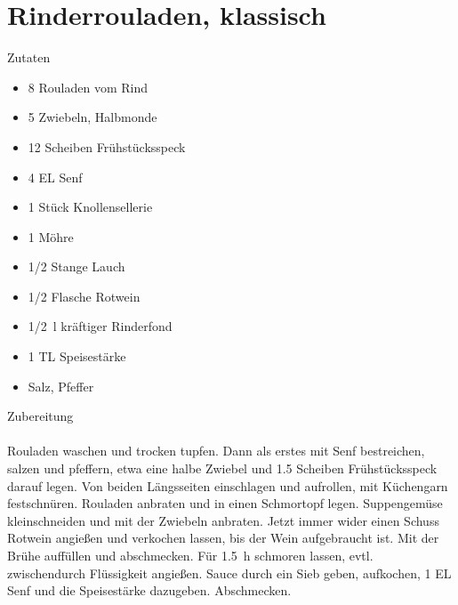 \section*{Rinderrouladen, klassisch}
\ihead{}\ohead{}
\cfoot{}
{\Large Zutaten}
\begin{multicols}{2}
\begin{itemize}
    \item \num{8} Rouladen vom Rind
    \item \num{5} Zwiebeln, Halbmonde
    \item \num{12} Scheiben Frühstücksspeck
    \item \num{4} EL Senf
    \item \num{1} Stück Knollensellerie
    \item \num{1} Möhre
    \item \num{1/2} Stange Lauch
    \item \num{1/2} Flasche Rotwein
    \item \SI{1/2}{l} kräftiger Rinderfond
    \item \num{1} TL Speisestärke
    \item Salz, Pfeffer
\end{itemize}
\end{multicols}
\noindent
{\Large Zubereitung}\\
\\
Rouladen waschen und trocken tupfen.
Dann als erstes mit Senf bestreichen, salzen und pfeffern, etwa eine halbe Zwiebel und \num{1.5} Scheiben Frühstücksspeck darauf legen.
Von beiden Längsseiten einschlagen und aufrollen, mit Küchengarn festschnüren.
Rouladen anbraten und in einen Schmortopf legen.
Suppengemüse kleinschneiden und mit der Zwiebeln anbraten.
Jetzt immer wider einen Schuss Rotwein angießen und verkochen lassen, bis der Wein aufgebraucht ist.
Mit der Brühe auffüllen und abschmecken.
Für \SI{1.5}{h} schmoren lassen, evtl. zwischendurch Flüssigkeit angießen.
Sauce durch ein Sieb geben, aufkochen, \num{1} EL Senf und die Speisestärke dazugeben. 
Abschmecken.